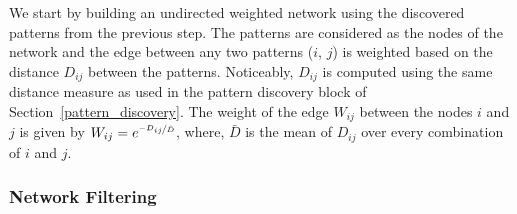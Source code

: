 We start by building an undirected weighted network using the discovered patterns from the previous step. The patterns are considered as the nodes of the network and the edge between any two patterns ($i$, $j$) is weighted based on the distance $D_{ij}$ between the patterns. Noticeably, $D_{ij}$ is computed using the same distance measure as used in the pattern discovery block of Section~\ref{pattern_discovery}. The weight of the edge $W_{ij}$ between the nodes $i$ and $j$ is given by $W_{ij} = e^{\nicefrac{-D_{ij}}{\bar{D}}}$, where, $\bar{D}$ is the mean of $D_{ij}$ over every combination of $i$ and $j$.



\subsubsection{Network Filtering}
\label{sec:network_filtering}

